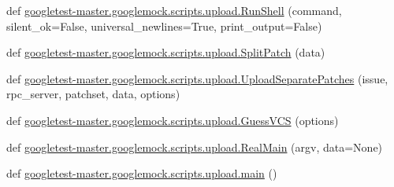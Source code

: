 \begin{DoxyCompactItemize}
def \mbox{\hyperlink{namespacegoogletest-master_1_1googlemock_1_1scripts_1_1upload_aeaf8df05437f41f4282d84e90b40ac7d}{googletest-\/master.\+googlemock.\+scripts.\+upload.\+Run\+Shell}} (command, silent\+\_\+ok=False, universal\+\_\+newlines=True, print\+\_\+output=False)
\item 
def \mbox{\hyperlink{namespacegoogletest-master_1_1googlemock_1_1scripts_1_1upload_aa51c64118998af0d17151d5ff6f40a50}{googletest-\/master.\+googlemock.\+scripts.\+upload.\+Split\+Patch}} (data)
\item 
def \mbox{\hyperlink{namespacegoogletest-master_1_1googlemock_1_1scripts_1_1upload_a09af80fd2ab4118212cfeaa3b3915cbf}{googletest-\/master.\+googlemock.\+scripts.\+upload.\+Upload\+Separate\+Patches}} (issue, rpc\+\_\+server, patchset, data, options)
\item 
def \mbox{\hyperlink{namespacegoogletest-master_1_1googlemock_1_1scripts_1_1upload_ac5380104609bd9c97ec5e0779c9a3b75}{googletest-\/master.\+googlemock.\+scripts.\+upload.\+Guess\+V\+CS}} (options)
\item 
def \mbox{\hyperlink{namespacegoogletest-master_1_1googlemock_1_1scripts_1_1upload_ac030650e3c90bac0be16eb64ce4f0a91}{googletest-\/master.\+googlemock.\+scripts.\+upload.\+Real\+Main}} (argv, data=None)
\item 
def \mbox{\hyperlink{namespacegoogletest-master_1_1googlemock_1_1scripts_1_1upload_a63d1ccb407218a15aacb6b04e4f1ce9e}{googletest-\/master.\+googlemock.\+scripts.\+upload.\+main}} ()
\end{DoxyCompactItemize}
